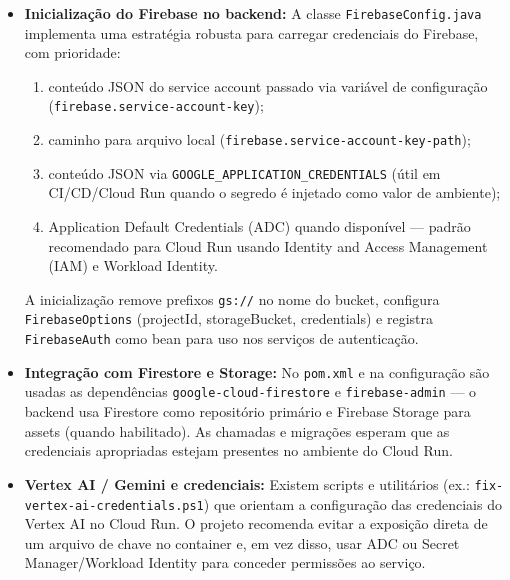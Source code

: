 \begin{itemize}
    \item \textbf{Inicialização do Firebase no backend:} A classe \texttt{FirebaseConfig.java} implementa uma estratégia robusta para carregar credenciais do Firebase, com prioridade:
        \begin{enumerate}
            \item conteúdo JSON do service account passado via variável de configuração (\texttt{firebase.service-account-key});
            \item caminho para arquivo local (\texttt{firebase.service-account-key-path});
            \item conteúdo JSON via \texttt{GOOGLE\_APPLICATION\_CREDENTIALS} (útil em CI/CD/Cloud Run quando o segredo é injetado como valor de ambiente);
            \item Application Default Credentials (ADC) quando disponível — padrão recomendado para Cloud Run usando Identity and Access Management (IAM) e Workload Identity.
        \end{enumerate}
        A inicialização remove prefixos \texttt{gs://} no nome do bucket, configura \texttt{FirebaseOptions} (projectId, storageBucket, credentials) e registra \texttt{FirebaseAuth} como bean para uso nos serviços de autenticação.

    \item \textbf{Integração com Firestore e Storage:} No \texttt{pom.xml} e na configuração são usadas as dependências \texttt{google-cloud-firestore} e \texttt{firebase-admin} — o backend usa Firestore como repositório primário e Firebase Storage para assets (quando habilitado). As chamadas e migrações esperam que as credenciais apropriadas estejam presentes no ambiente do Cloud Run.

    \item \textbf{Vertex AI / Gemini e credenciais:} Existem scripts e utilitários (ex.: \texttt{fix-vertex-ai-credentials.ps1}) que orientam a configuração das credenciais do Vertex AI no Cloud Run. O projeto recomenda evitar a exposição direta de um arquivo de chave no container e, em vez disso, usar ADC ou Secret Manager/Workload Identity para conceder permissões ao serviço.


\end{itemize}
